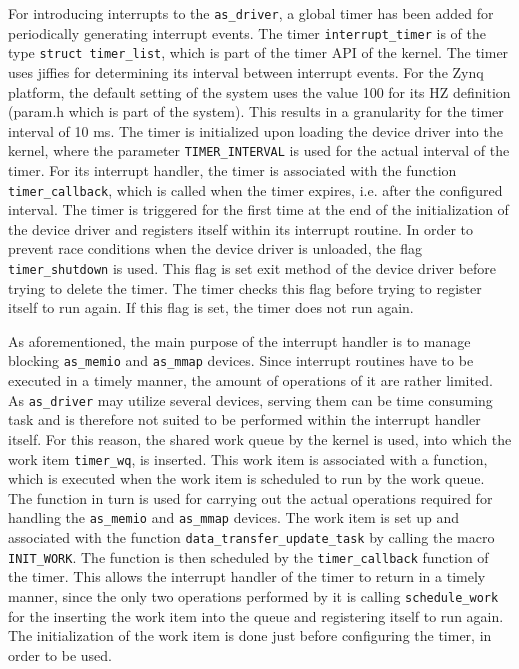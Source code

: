 For introducing interrupts to the \texttt{as\_driver}, a global timer has been added for periodically generating interrupt events. 
The timer \texttt{interrupt\_timer} is of the type \texttt{struct timer\_list}, which is part of the timer API of the kernel. 
The timer uses jiffies for determining its interval between interrupt events. 
For the Zynq platform, the default setting of the system uses the value 100 for its HZ definition (param.h which is part of the system). 
This results in a granularity for the timer interval of 10 ms. 
The timer is initialized upon loading the device driver into the kernel, where the parameter \texttt{TIMER\_INTERVAL} is used for the actual interval of the timer. 
For its interrupt handler, the timer is associated with the function \texttt{timer\_callback}, which is called when the timer expires, i.e. after the configured interval. 
The timer is triggered for the first time at the end of the initialization of the device driver and registers itself within its interrupt routine. 
In order to prevent race conditions when the device driver is unloaded, the flag \texttt{timer\_shutdown} is used. This flag is set exit method of the device driver before trying to delete the timer. 
The timer checks this flag before trying to register itself to run again. 
If this flag is set, the timer does not run again.

As aforementioned, the main purpose of the interrupt handler is to manage blocking \texttt{as\_memio} and \texttt{as\_mmap} devices. 
Since interrupt routines have to be executed in a timely manner, the amount of operations of it are rather limited. As \texttt{as\_driver} may utilize several devices, serving them can be time consuming task and is therefore not suited to be performed within the interrupt handler itself.
For this reason, the shared work queue by the kernel is used, into which the work item \texttt{timer\_wq}, is inserted. 
This work item is associated with a function, which is executed when the work item is scheduled to run by the work queue. 
The function in turn is used for carrying out the actual operations required for handling the \texttt{as\_memio} and \texttt{as\_mmap} devices. 
The work item is set up and associated with the function \texttt{data\_transfer\_update\_task} by calling the macro \texttt{INIT\_WORK}. 
The function is then scheduled by the \texttt{timer\_callback} function of the timer.
This allows the interrupt handler of the timer to return in a timely manner, since the only two operations performed by it is calling \texttt{schedule\_work} for the inserting the work item into the queue and registering itself to run again. 
The initialization of the work item is done just before configuring the timer, in order to be used.

